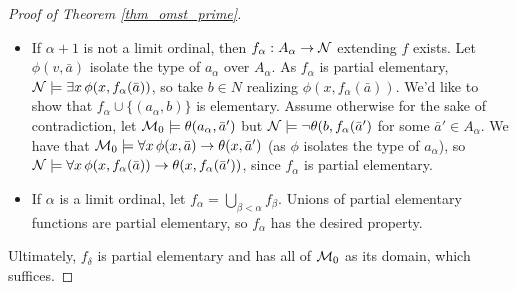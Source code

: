 \begin{proof}[Proof of Theorem \ref{thm_omst_prime}]
\begin{itemize}
\item If \(\alpha + 1\) is not a limit ordinal, then \(f_\alpha: A_\alpha \to \mathcal{N}\) extending \(f\) exists. 
Let \(\phi(v, \bar{a})\) isolate the type of \(a_\alpha\) over \(A_\alpha\). 
As \(f_\alpha\) is partial elementary, \(\mathcal{N} \models \exists x \, \phi(x, f_\alpha(\bar{a}))\), so take \(b \in N\) realizing \(\phi(x, f_\alpha(\bar{a}))\).
We'd like to show that \(f_\alpha \cup \{(a_\alpha, b)\}\) is elementary. 
Assume otherwise for the sake of contradiction, let \(\mathcal{M}_0 \models \theta(a_\alpha, \bar{a}')\) but \(\mathcal{N} \models \neg\theta(b, f_\alpha(\bar{a}')\) for some \(\bar{a}' \in A_\alpha\). 
We have that \(\mathcal{M}_0 \models \forall x \, \phi(x, \bar{a}) \to \theta(x, \bar{a}')\) (as \(\phi\) isolates the type of \(a_\alpha\)), so \(\mathcal{N}\models\forall x \, \phi(x, f_\alpha(\bar{a})) \to \theta(x, f_\alpha(\bar{a}'))\), since \(f_\alpha\) is partial elementary.

\item If \(\alpha\) is a limit ordinal, let \(f_\alpha = \bigcup\limits_{\beta < \alpha}f_\beta\). Unions of partial elementary functions are partial elementary, so \(f_\alpha\) has the desired property.
\end{itemize}
 
\noindent Ultimately, \(f_\delta\) is partial elementary and has all of \(\mathcal{M}_0\) as its domain, which suffices. 
\end{proof}